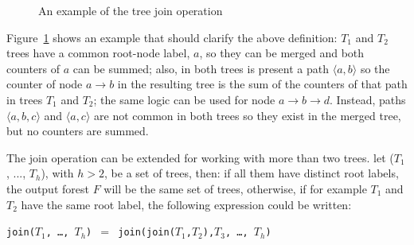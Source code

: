 \documentclass[a4paper,11pt]{report}
\begin{document}
\begin{figure}[h]

\begin{center}
\end{center}

\caption{An example of the tree join operation}
\label{join1}
\end{figure}

Figure~\ref{join1} shows an example that should clarify the above definition:
$T_1$ and $T_2$ trees have a common root-node label, $a$, so they can be merged and 
both counters of $a$ can be summed; also, in both trees is present a path $\langle a,b\rangle$ so the counter of node $a\rightarrow b$ in the resulting tree 
is the sum of the counters of that path in trees $T_1$ and $T_2$; 
the same logic can be used for node $a\rightarrow b\rightarrow d$. 
Instead, paths $\langle a, b, c\rangle$ and $\langle a, c\rangle$ are not common 
in both trees so they exist in the merged tree, but no counters are summed.

The join operation can be extended for working with more than two trees.
let ($T_1$, ..., $T_h$), with $h > 2$, be a set of trees, then:
if all them have distinct root labels, the output forest $F$ will be the same
set of trees, otherwise, if for example $T_1$ and $T_2$ have the same root label,
the following expression could be written:
\begin{center}
\texttt{join($T_1$, \dots, $T_h$) $=$ join(join($T_1$,$T_2$),$T_3$, \ldots, $T_h$)}
\end{center}
\end{document}
